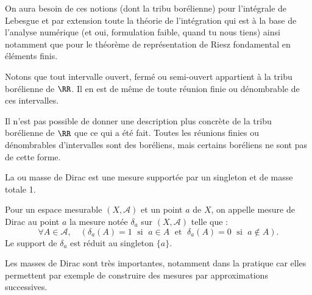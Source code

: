 On aura besoin de ces notions (dont la tribu borélienne) pour l'intégrale de Lebesgue et par extension
toute la théorie de l'intégration qui est à la base de l'analyse numérique (et oui, formulation faible, quand
tu nous tiens) ainsi notamment que pour le théorème  de représentation de Riesz fondamental en
éléments finis.

\medskip
Notons que tout intervalle ouvert, fermé ou semi-ouvert appartient à la tribu borélienne de $\RR$.
Il en est de même de toute réunion finie ou dénombrable de ces intervalles.

\medskip
Il n'est pas possible de donner une description plus concrète de la tribu
borélienne de $\RR$ que ce qui a été fait. Toutes les réunions finies ou dénombrables d'intervalles 
sont des boréliens, mais certains boréliens ne sont pas de cette forme. 



La 
ou masse de Dirac est une mesure supportée par un singleton
et de masse totale 1.

\begin{definition}
Pour un espace mesurable $(X,\mathcal{A})$ et un point $a$ de $X$, on appelle mesure de Dirac au
point $a$ la mesure notée $\delta_a$ sur $(X, \mathcal{A})$ telle que :
\begin{equation}
    \forall A \in \mathcal{A},\quad ( \delta_a(A)=1 \; \text{ si } \; a \in A \; \text{ et } \; \delta_a(A)=0 \; \text{ si } \; a \notin A ).
\end{equation}
Le support de $\delta_a$ est réduit au singleton $\{a\}$.
\end{definition}

Les masses de Dirac sont très importantes, notamment dans la pratique car elles permettent par exemple
de construire des mesures par approximations successives.


